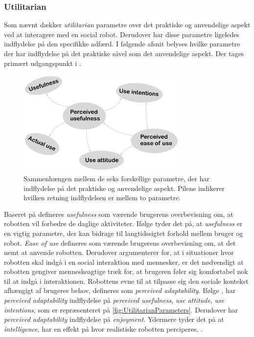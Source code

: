 \subsubsection*{Utilitarian}
\label{InteraktionSocialeRobotterParametreUtilitarian}
%
Som nævnt dækker \textit{utilitarian} parametre over det praktiske og anvendelige aspekt ved at interagere med en social robot. Derudover har disse parametre ligeledes indflydelse på den specifikke adfærd. I følgende afsnit belyses hvilke parametre der har indflydelse på det praktiske såvel som det anvendelige aspekt. Der tages primært udgangspunkt i \textcite[s. 1477]{PDF:SharingALifeHarvey}.
%
\begin{figure}[H]
\centering
\includegraphics[width = 0.75\textwidth]{Figure/UtilitarianParameters} 
\caption{Sammenhængen mellem de seks forskellige parametre, der har indflydelse på det praktiske og anvendelige aspekt. Pilene indikerer hvilken retning indflydelsen er mellem to parametre.}
\label{fig:UtilitarianParameters}
\end{figure}
\noindent 
%
Baseret på \textcite[s. 1477]{PDF:SharingALifeHarvey} defineres \textit{usefulness} som værende brugerens overbevisning om, at robotten vil forbedre de daglige aktiviteter. Ifølge \textcite[s. 11]{PDF:SharingALifeHarvey} tyder det på, at \textit{usefulness} er en vigtig parametre, der kan bidrage til langtidssigtet forhold mellem bruger og robot. \textit{Ease of use} defineres som værende brugerens overbevisning om, at det nemt at anvende robotten. Derudover argumenterer \textcite[s. 1477]{PDF:SharingALifeHarvey} for, at i situationer hvor robotten skal indgå i en social interaktion med mennesker, er det nødvendigt at robotten gengiver menneskeagtige træk for, at brugeren føler sig komfortabel nok til at indgå i interaktionen. Robottens evne til at tilpasse sig den sociale kontekst afhængigt af brugeres behov, defineres som \textit{perceived adaptability}. Ifølge \textcite[s. 1477]{PDF:SharingALifeHarvey}, har \textit{perceived adaptability} indflydelse på \textit{perceived usefulness}, \textit{use attitude}, \textit{use intentions}, som er repræsenteret på \autoref{fig:UtilitarianParameters}. Derudover har \textit{perceived adaptability} indflydelse på \textit{enjoyment}. Ydermere tyder det på at \textit{intelligence}, har en effekt på hvor realistiske robotten perciperes, \parencite[s. 1477]{PDF:ExploringInfluencingVariable}.   
%
